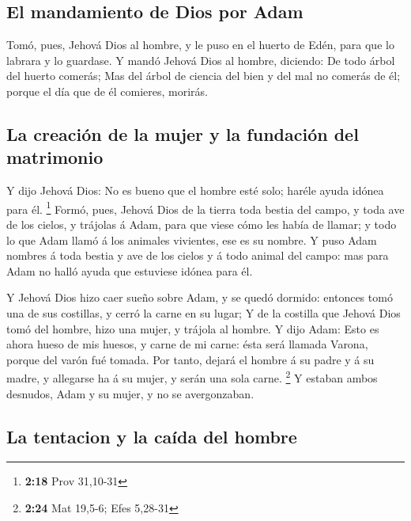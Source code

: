 \hypertarget{el-mandamiento-de-dios-por-adam}{%
\subsection{El mandamiento de Dios por
Adam}\label{el-mandamiento-de-dios-por-adam}}

 Tomó, pues, Jehová Dios al hombre, y le puso en el
huerto de Edén, para que lo labrara y lo guardase.  Y
mandó Jehová Dios al hombre, diciendo: De todo árbol del huerto comerás;
 Mas del árbol de ciencia del bien y del mal no comerás
de él; porque el día que de él comieres, morirás.

\hypertarget{la-creaciuxf3n-de-la-mujer-y-la-fundaciuxf3n-del-matrimonio}{%
\subsection{La creación de la mujer y la fundación del
matrimonio}\label{la-creaciuxf3n-de-la-mujer-y-la-fundaciuxf3n-del-matrimonio}}

 Y dijo Jehová Dios: No es bueno que el hombre esté solo;
haréle ayuda idónea para él. \footnote{\textbf{2:18} Prov 31,10-31}
 Formó, pues, Jehová Dios de la tierra toda bestia del
campo, y toda ave de los cielos, y trájolas á Adam, para que viese cómo
les había de llamar; y todo lo que Adam llamó á los animales vivientes,
ese es su nombre.  Y puso Adam nombres á toda bestia y
ave de los cielos y á todo animal del campo: mas para Adam no halló
ayuda que estuviese idónea para él.

 Y Jehová Dios hizo caer sueño sobre Adam, y se quedó
dormido: entonces tomó una de sus costillas, y cerró la carne en su
lugar;  Y de la costilla que Jehová Dios tomó del hombre,
hizo una mujer, y trájola al hombre.  Y dijo Adam: Esto
es ahora hueso de mis huesos, y carne de mi carne: ésta será llamada
Varona, porque del varón fué tomada.  Por tanto, dejará
el hombre á su padre y á su madre, y allegarse ha á su mujer, y serán
una sola carne. \footnote{\textbf{2:24} Mat 19,5-6; Efes 5,28-31}
 Y estaban ambos desnudos, Adam y su mujer, y no se
avergonzaban.

\hypertarget{la-tentacion-y-la-cauxedda-del-hombre}{%
\subsection{La tentacion y la caída del
hombre}\label{la-tentacion-y-la-cauxedda-del-hombre}}

